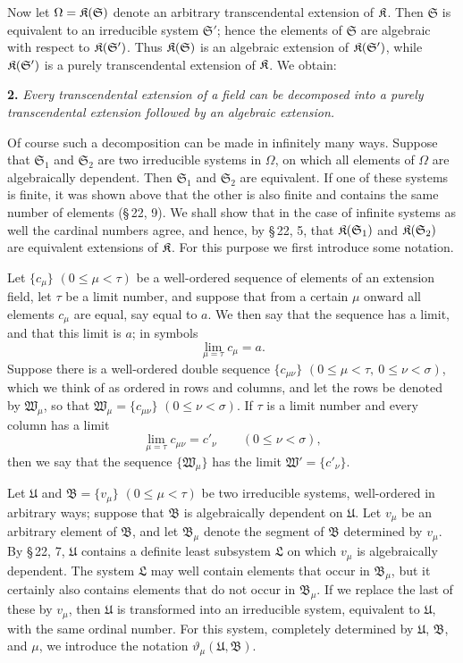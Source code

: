Now let \(\Omega=\mathfrak K(\mathfrak S)\) denote an arbitrary transcendental extension of \(\mathfrak K\). Then \(\mathfrak S\) is equivalent to an irreducible system \(\mathfrak S'\); hence the elements of \(\mathfrak S\) are algebraic with respect to \(\mathfrak K(\mathfrak S')\). Thus \(\mathfrak K(\mathfrak S)\) is an algebraic extension of \(\mathfrak K(\mathfrak S')\), while \(\mathfrak K(\mathfrak S')\) is a purely transcendental extension of \(\mathfrak K\). We obtain:

\textbf{2.} \emph{Every transcendental extension of a field can be decomposed into a purely transcendental extension followed by an algebraic extension.}

Of course such a decomposition can be made in infinitely many ways. Suppose that \(\mathfrak S_1\) and \(\mathfrak S_2\) are two irreducible systems in \(\Omega\), on which all elements of \(\Omega\) are algebraically dependent. Then \(\mathfrak S_1\) and \(\mathfrak S_2\) are equivalent. If one of these systems is finite, it was shown above that the other is also finite and contains the same number of elements (\S\,22, 9). We shall show that in the case of infinite systems as well the cardinal numbers agree, and hence, by \S\,22, 5, that \(\mathfrak K(\mathfrak S_1)\) and \(\mathfrak K(\mathfrak S_2)\) are equivalent extensions of \(\mathfrak K\). For this purpose we first introduce some notation.

Let \(\{c_\mu\}\) \((0\leq\mu<\tau)\) be a well-ordered sequence of elements of an extension field, let \(\tau\) be a limit number, and suppose that from a certain \(\mu\) onward all elements \(c_\mu\) are equal, say equal to \(a\). We then say that the sequence has a limit, and that this limit is \(a\); in symbols
\[
\lim_{\mu=\tau} c_\mu=a.
\]
Suppose there is a well-ordered double sequence \(\{c_{\mu\nu}\}\) \((0\leq\mu<\tau,\ 0\leq\nu<\sigma)\), which we think of as ordered in rows and columns, and let the rows be denoted by \(\mathfrak W_\mu\), so that \(\mathfrak W_\mu=\{c_{\mu\nu}\}\) \((0\leq\nu<\sigma)\). If \(\tau\) is a limit number and every column has a limit
\[
\lim_{\mu=\tau}c_{\mu\nu}=c'_{\nu}\qquad(0\leq\nu<\sigma),
\]
then we say that the sequence \(\{\mathfrak W_\mu\}\) has the limit \(\mathfrak W'=\{c'_{\nu}\}\).

Let \(\mathfrak U\) and \(\mathfrak B=\{v_\mu\}\) \((0\leq\mu<\tau)\) be two irreducible systems, well-ordered in arbitrary ways; suppose that \(\mathfrak B\) is algebraically dependent on \(\mathfrak U\). Let \(v_\mu\) be an arbitrary element of \(\mathfrak B\), and let \(\mathfrak B_\mu\) denote the segment of \(\mathfrak B\) determined by \(v_\mu\). By \S\,22, 7, \(\mathfrak U\) contains a definite least subsystem \(\mathfrak L\) on which \(v_\mu\) is algebraically dependent. The system \(\mathfrak L\) may well contain elements that occur in \(\mathfrak B_\mu\), but it certainly also contains elements that do not occur in \(\mathfrak B_\mu\). If we replace the last of these by \(v_\mu\), then \(\mathfrak U\) is transformed into an irreducible system, equivalent to \(\mathfrak U\), with the same ordinal number. For this system, completely determined by \(\mathfrak U\), \(\mathfrak B\), and \(\mu\), we introduce the notation \(\vartheta_\mu(\mathfrak U,\mathfrak B)\).

